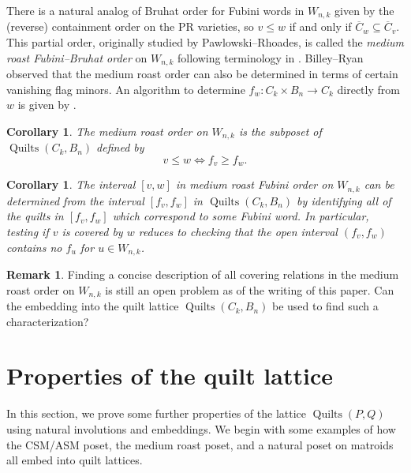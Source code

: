 \documentclass[12pt]{amsart}
\numberwithin{equation}{section}
\newtheorem{cor}[theorem]{Corollary}
\theoremstyle{definition}
\newtheorem{remark}[theorem]{Remark}
\newcommand{\quilt}{\operatorname{Quilts}}
\begin{document}
There is a natural analog of Bruhat order for Fubini words in
$W_{n,k}$ given by the (reverse) containment order on the PR
varieties, so $v\leq w$ if and only if $\overline{C}_{w} \subseteq
\overline{C}_{v}$.  This partial order, originally studied by
Pawlowski--Rhoades, is called the \textit{medium roast Fubini--Bruhat
order} on $W_{n,k}$ following terminology in
\cite{Billey-Ryan,Ryan.2022}.  Billey--Ryan observed that the medium
roast order can also be determined in terms of certain vanishing flag
minors.   An algorithm to determine $f_{w}:C_{k} \times
B_{n}\longrightarrow C_{k}$ directly from $w$ is given by \cite[Lemma
5.2.8]{Ryan.2022}.


\begin{cor}\label{cor:medium.roast.quilts}
The medium roast order on $W_{n,k}$ is the subposet of
$\quilt(C_k,B_n)$ defined by
\[
v\leq w \iff f_{v} \geq f_{w}.
\]
\end{cor}

\begin{cor}\label{cor:intervals.in.medium}
The interval $[v,w]$ in medium roast Fubini order on $W_{n,k}$ can be
determined from the interval $[f_{v},f_{w}]$ in $\quilt(C_k,B_n)$ by
identifying all of the quilts in $[f_{v},f_{w}]$ which correspond to
some Fubini word.  In particular, testing if $v$ is covered by $w$
reduces to checking that the open interval $(f_{v},f_{w})$ contains no
$f_{u}$ for $u \in W_{n,k}$.
\end{cor}

\begin{remark}
Finding a concise description of all covering relations in the medium
roast order on $W_{n,k}$ is still an open problem as of the writing of
this paper.  Can the embedding into the quilt lattice
$\quilt(C_k,B_n)$ be used to find such a characterization?
\end{remark}




\section{Properties of the quilt lattice} \label{sec:lattice}

In this section, we prove some further properties of the lattice
$\quilt(P,Q)$ using natural involutions and embeddings.  We begin with
some examples of how the CSM/ASM poset, the medium roast poset, and a
natural poset on matroids all embed into quilt lattices.
\end{document}
